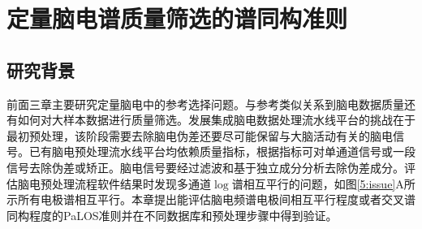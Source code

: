 \chapter{定量脑电谱质量筛选的谱同构准则}
\section{研究背景}
前面三章主要研究定量脑电中的参考选择问题。与参考类似关系到脑电数据质量还有如何对大样本数据进行质量筛选。发展集成脑电数据处理流水线平台的挑战在于最初预处理，该阶段需要去除脑电伪差还要尽可能保留与大脑活动有关的脑电信号。已有脑电预处理流水线平台均依赖质量指标，根据指标可对单通道信号或一段信号去除伪差或矫正。脑电信号要经过滤波和基于独立成分分析去除伪差成分。评估脑电预处理流程软件结果时发现多通道$\log$谱相互平行的问题，如图\ref{5:issue}A所示所有电极谱相互平行。本章提出能评估脑电频谱电极间相互平行程度或者交叉谱同构程度的PaLOS准则并在不同数据库和预处理步骤中得到验证。

